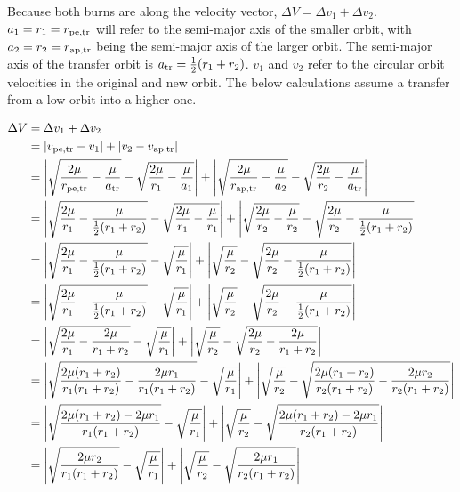 \documentclass[../basicOrbitalDynamics.tex]{subfiles}
\begin{document}
Because both burns are along the velocity vector, $\Delta V=\Delta v_1+\Delta v_2$. $a_1=r_1={r}_\text{pe,tr}$ will refer to the semi-major axis of the smaller orbit, with $a_2=r_2={r}_\text{ap,tr}$ being the semi-major axis of the larger orbit. The semi-major axis of the transfer orbit is ${a}_\text{tr}=\frac{1}{2}(r_1+r_2)$. $v_1$ and $v_2$ refer to the circular orbit velocities in the original and new orbit. The below calculations assume a transfer from a low orbit into a higher one.

\begin{align*}
    \Delta V &= \Delta v_1+\Delta v_2\\
    &= |{v}_\text{pe,tr}-v_1|+|v_2-{v}_\text{ap,tr}|\\
    &= \left|\sqrt{\frac{2\mu}{{r}_\text{pe,tr}}-\frac{\mu}{{a}_\text{tr}}}-\sqrt{\frac{2\mu}{r_1}-\frac{\mu}{a_1}}\right|+\left|\sqrt{\frac{2\mu}{{r}_\text{ap,tr}}-\frac{\mu}{a_2}}-\sqrt{\frac{2\mu}{r_2}-\frac{\mu}{{a}_\text{tr}}}\right| \\
    &= \left|\sqrt{\frac{2\mu}{r_1}-\frac{\mu}{\frac{1}{2}(r_1+r_2)}}-\sqrt{\frac{2\mu}{r_1}-\frac{\mu}{r_1}}\right|+\left|\sqrt{\frac{2\mu}{r_2}-\frac{\mu}{r_2}}-\sqrt{\frac{2\mu}{r_2}-\frac{\mu}{\frac{1}{2}(r_1+r_2)}}\right|\\
    &= \left|\sqrt{\frac{2\mu}{r_1}-\frac{\mu}{\frac{1}{2}(r_1+r_2)}}-\sqrt{\frac{\mu}{r_1}}\right|+\left|\sqrt{\frac{\mu}{r_2}}-\sqrt{\frac{2\mu}{r_2}-\frac{\mu}{\frac{1}{2}(r_1+r_2)}}\right|\\
    &= \left|\sqrt{\frac{2\mu}{r_1}-\frac{\mu}{\frac{1}{2}(r_1+r_2)}}-\sqrt{\frac{\mu}{r_1}}\right|+\left|\sqrt{\frac{\mu}{r_2}}-\sqrt{\frac{2\mu}{r_2}-\frac{\mu}{\frac{1}{2}(r_1+r_2)}}\right|\\
    &= \left|\sqrt{\frac{2\mu}{r_1}-\frac{2\mu}{r_1+r_2}}-\sqrt{\frac{\mu}{r_1}}\right|+\left|\sqrt{\frac{\mu}{r_2}}-\sqrt{\frac{2\mu}{r_2}-\frac{2\mu}{r_1+r_2}}\right|\\
    &= \left|\sqrt{\frac{2\mu(r_1+r_2)}{r_1(r_1+r_2)}-\frac{2\mu{}r_1}{r_1(r_1+r_2)}}-\sqrt{\frac{\mu}{r_1}}\right|+\left|\sqrt{\frac{\mu}{r_2}}-\sqrt{\frac{2\mu(r_1+r_2)}{r_2(r_1+r_2)}-\frac{2\mu{}r_2}{r_2(r_1+r_2)}}\right|\\
    &= \left|\sqrt{\frac{2\mu(r_1+r_2)-2\mu{}r_1}{r_1(r_1+r_2)}}-\sqrt{\frac{\mu}{r_1}}\right|+\left|\sqrt{\frac{\mu}{r_2}}-\sqrt{\frac{2\mu(r_1+r_2)-2\mu{}r_1}{r_2(r_1+r_2)}}\right|\\
    &= \left|\sqrt{\frac{2\mu{}r_2}{r_1(r_1+r_2)}}-\sqrt{\frac{\mu}{r_1}}\right|+\left|\sqrt{\frac{\mu}{r_2}}-\sqrt{\frac{2\mu{}r_1}{r_2(r_1+r_2)}}\right|\\
\end{align*}
\end{document}
